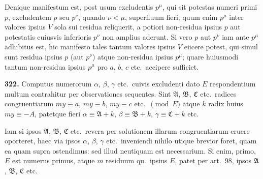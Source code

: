 \documentclass[12pt,a4paper]{article}
\theoremstyle{plain}
\theoremstyle{definition}
\theoremstyle{remark}
\begin{document}
Denique manifestum est, post usum excludentis $p^\mu$, qui sit potestas numeri primi $p$, excludentem $p$ seu $p^\nu$, quando $\nu < \mu$, superfluum fieri; quum enim $p^\mu$ inter valores ipsius $V$ sola sui residua reliquerit, a potiori non-residua ipsius $p$ aut potestatis cuiusvis inferioris $p^\nu$ non amplius aderunt. Si vero $p$ aut $p^\nu$ iam ante $p^\mu$ adhibitus est, hic manifesto tales tantum valores ipsius $V$ eiicere potest, qui simul sunt residua ipsius $p$ (aut $p^\nu$) atque non-residua ipsius $p^\mu$; quare huiusmodi tantum non-residua ipsius $p^\mu$ pro $a$, $b$, $c$ etc.~accipere sufficiet.

\textbf{322.} Computus numerorum $\alpha$, $\beta$, $\gamma$ etc.~cuivis excludenti dato $E$ respondentium multum contrahitur per observationes sequentes. Sint $\mathfrak{A}$, $\mathfrak{B}$, $\mathfrak{C}$ etc.~radices congruentiarum $my \equiv a$, $my \equiv b$, $my \equiv c$ etc.~$\pmod{E}$ atque $k$ radix huius $my \equiv -A$, patetque fieri $\alpha \equiv \mathfrak{A} + k$, $\beta \equiv \mathfrak{B} + k$, $\gamma \equiv \mathfrak{C} + k$ etc.

Iam si ipsos $\mathfrak{A}$, $\mathfrak{B}$, $\mathfrak{C}$ etc.~revera per solutionem illarum congruentiarum eruere oporteret, haec via ipsos $\alpha$, $\beta$, $\gamma$ etc.~inveniendi nihilo utique brevior foret, quam ea quam supra ostendimus: sed illud neutiquam est necessarium. Si enim, primo, $E$ est numerus primus, atque $m$ residuum qu.~ipsius $E$, patet per art.~98, ipsos $\mathfrak{A}$, $\mathfrak{B}$, $\mathfrak{C}$ etc.
\end{document}
